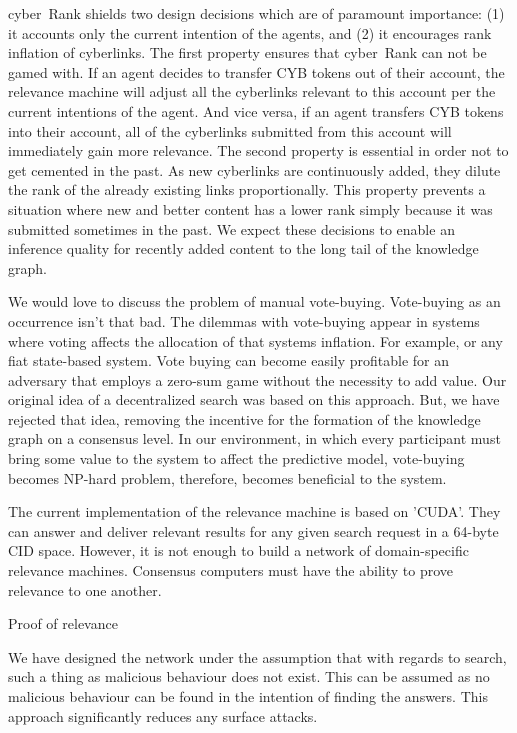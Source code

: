 \documentclass[8pt,oneside]{amsart}
\makeatletter
\newcommand{\linkgreen}[2]{\href{#1}{\color{green}{#2}}}
\renewcommand\subsection{\@startsection{subsection}
                                    {2}{\z@}
                                    {-3.25ex\@plus -1ex \@minus -.2ex}
                                    {0ex \@plus .2ex}
                                    {\play\Large}
                        }
\newcommand{\titleSection}[1]{\subsection{#1}}
\makeatother
\begin{document}
cyber~Rank shields two design decisions which are of paramount importance: (1) it accounts only the current intention of the agents, and (2) it encourages rank inflation of cyberlinks. The first property ensures that cyber~Rank can not be gamed with. If an agent decides to transfer CYB tokens out of their account, the relevance machine will adjust all the cyberlinks relevant to this account per the current intentions of the agent. And vice versa, if an agent transfers CYB tokens into their account, all of the cyberlinks submitted from this account will immediately gain more relevance. The second property is essential in order not to get cemented in the past. As new cyberlinks are continuously added, they dilute the rank of the already existing links proportionally. This property prevents a situation where new and better content has a lower rank simply because it was submitted sometimes in the past. We expect these decisions to enable an inference quality for recently added content to the long tail of the knowledge graph.

We would love to discuss the problem of manual vote-buying. Vote-buying as an occurrence isn't that bad. The dilemmas with vote-buying appear in systems where voting affects the allocation of that systems inflation. For example, \linkgreen{http://ipfs.io/ipfs/QmepU77tqMAHHuiSASUvUnu8f8ENuPF2Kfs97WjLn8vAS3}{Steem}
or any fiat state-based system. Vote buying can become easily profitable for an adversary that employs a zero-sum game without the necessity to add value. Our original idea of a decentralized search was based on this approach. But, we have rejected that idea, removing the incentive for the formation of the knowledge graph on a consensus level. In our environment, in which every participant must bring some value to the system to affect the predictive model, vote-buying becomes NP-hard problem, therefore, becomes beneficial to the system.

The current implementation of the relevance machine is based on 'CUDA'. They can answer and deliver relevant results for any given search request in a 64-byte CID space. However, it is not enough to build a network of domain-specific relevance machines. Consensus computers must have the ability to prove relevance to one another.

\titleSection{Proof of relevance}\label{Proof of relevance}

We have designed the network under the assumption that with regards to search, such a thing as malicious behaviour does not exist. This can be assumed as no malicious behaviour can be found in the intention of finding the answers. This approach significantly reduces any surface attacks.
\end{document}
